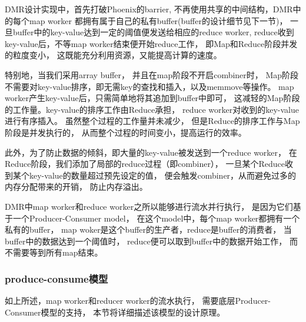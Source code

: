 DMR设计实现中，首先打破Phoenix的barrier,
不再使用共享的中间结构，DMR中的每个map worker
都拥有属于自己的私有buffer(buffer的设计细节见下一节)，
一旦buffer中的key-value达到一定的阈值便发送给相应的reduce worker,
reduce收到key-value后，不等map worker结束便开始reduce工作，
即Map和Reduce阶段并发的粒度变小，
这既能充分利用资源，又能提高计算的速度。

特别地，当我们采用array buffer，
并且在map阶段不开启combiner时，
Map阶段不需要对key-value排序，即无需key的查找和插入，以及memmove等操作。
map worker产生key-value后，只需简单地将其追加到buffer中即可，
这减轻的Map阶段的工作量。key-value的排序工作由Reduce承担，
reduce worker对收到的key-value进行有序插入。
虽然整个过程的工作量并未减少，
但是Reduce的排序工作与Map阶段是并发执行的，
从而整个过程的时间变小，提高运行的效率。

此外，为了防止数据的倾斜，即大量的key-value被发送到一个reduce worker，
在Reduce阶段，我们添加了局部的reduce过程（即combiner），
一旦某个Reduce收到某个key-value的数量超过预先设定的值，
便会触发combiner，从而避免过多的内存分配带来的开销，
防止内存溢出。

DMR中map worker和reduce worker之所以能够进行流水并行执行，
是因为它们基于一个Producer-Consumer model，
在这个model中，每个map worker都拥有一个私有的buffer，
map woker是这个buffer的生产者，reduce是buffer的消费者，
当buffer中的数据达到一个阈值时，
reduce便可以取到buffer中的数据开始工作，
而不需要等到所有map结束。



\subsubsection{produce-consume模型}
如上所述，map worker和reducer worker的流水执行，
需要底层Producer-Consumer模型的支持，
本节将详细描述该模型的设计原理。

